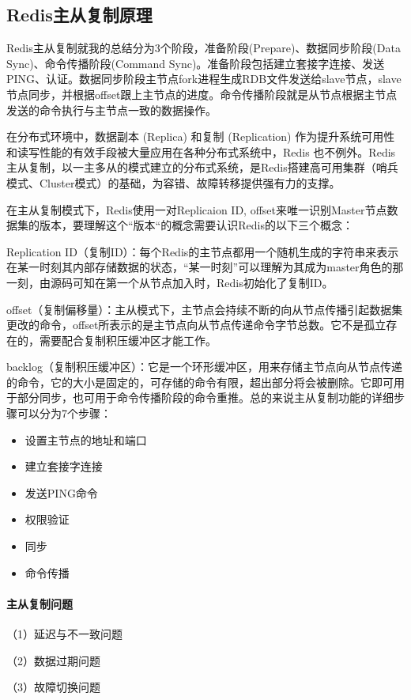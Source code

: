 \documentclass[../../../interview-questions.tex]{subfiles}
\begin{document}
\subsection{Redis主从复制原理}

Redis主从复制就我的总结分为3个阶段，准备阶段(Prepare)、数据同步阶段(Data Sync)、命令传播阶段(Command Sync)。准备阶段包括建立套接字连接、发送PING、认证。数据同步阶段主节点fork进程生成RDB文件发送给slave节点，slave节点同步，并根据offset跟上主节点的进度。命令传播阶段就是从节点根据主节点发送的命令执行与主节点一致的数据操作。

在分布式环境中，数据副本 (Replica) 和复制 (Replication) 作为提升系统可用性和读写性能的有效手段被大量应用在各种分布式系统中，Redis 也不例外。Redis主从复制，以一主多从的模式建立的分布式系统，是Redis搭建高可用集群（哨兵模式、Cluster模式）的基础，为容错、故障转移提供强有力的支撑。

在主从复制模式下，Redis使用一对Replicaion ID, offset来唯一识别Master节点数据集的版本，要理解这个“版本“的概念需要认识Redis的以下三个概念：

Replication ID（复制ID）：每个Redis的主节点都用一个随机生成的字符串来表示在某一时刻其内部存储数据的状态，“某一时刻”可以理解为其成为master角色的那一刻，由源码可知在第一个从节点加入时，Redis初始化了复制ID。

offset（复制偏移量）：主从模式下，主节点会持续不断的向从节点传播引起数据集更改的命令，offset所表示的是主节点向从节点传递命令字节总数。它不是孤立存在的，需要配合复制积压缓冲区才能工作。

backlog（复制积压缓冲区）：它是一个环形缓冲区，用来存储主节点向从节点传递的命令，它的大小是固定的，可存储的命令有限，超出部分将会被删除。它即可用于部分同步，也可用于命令传播阶段的命令重推。总的来说主从复制功能的详细步骤可以分为7个步骤：

\begin{itemize}
    \item {设置主节点的地址和端口}
    \item {建立套接字连接}
    \item {发送PING命令}
    \item {权限验证}
    \item {同步}
    \item {命令传播}
\end{itemize}

\paragraph{主从复制问题}

（1）延迟与不一致问题

（2）数据过期问题

（3）故障切换问题
\end{document}
